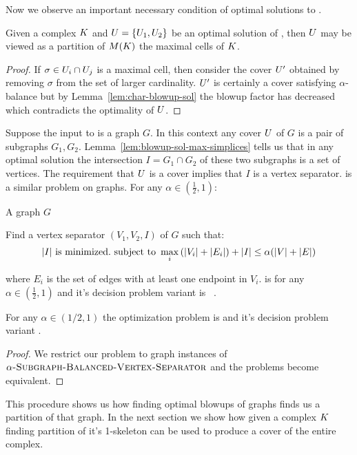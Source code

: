 \documentclass{jocg}
\begin{document}
\noindent Now we observe an important necessary condition of optimal solutions to \ablp{}.
\begin{lemma}
\label{lem:blowup-sol-max-simplices}
Given a complex $K$ and $U = \{U_1, U_2\}$ be an optimal solution of  \ablp{}, then 
$U$ may be viewed as a partition of $M(K)$ the maximal cells of $K$.
\end{lemma}
\begin{proof}
If $\sigma \in U_i \cap U_j$ is a maximal cell, then consider the cover
$U'$ obtained by removing $\sigma$ from the set of larger
cardinality. $U'$ is certainly a cover satisfying $\alpha$-balance but
by Lemma~\ref{lem:char-blowup-sol} the blowup factor has decreased
which contradicts the optimality of $U$.
\end{proof}
\noindent Suppose the input to \ablp{} is a graph $G$. In this context any cover $U$ of $G$ is a pair of subgraphs $G_1,G_2$.
Lemma~\ref{lem:blowup-sol-max-simplices} tells us that in any optimal solution the intersection $I = G_1 \cap G_2$ of these two 
subgraphs is a set of vertices. The requirement that $U$ is a cover implies that $I$ is a vertex separator.  \avertex{} is a similar problem on graphs. 
For any $\alpha \in (\frac{1}{2},1)$:
\begin{description}
\addtolength{\itemsep}{-.8\baselineskip}
\item[\textsc{Problem:}]  \avertex{}
\item[\textsc{Instance:}] A graph $G$
\item[\textsc{Goal:}] Find a vertex separator $(V_1,V_2,I)$ of $G$ such that: 
\[ |I| \textrm{ is minimized.} \textrm{ subject to } \max_i{(|V_i| + |E_i|)} + |I| \leq \alpha(|V|+|E|)  \]
\end{description}
where $E_i$ is the set of edges with at least one endpoint in $V_i$. \avertex{} is \NPH{} for any $\alpha \in (\frac{1}{2},1)$ and it's decision problem variant is \NPC{}~\cite{rhl-yaggpis-14}.
\begin{theorem}
For any $\alpha \in (1/2,1)$ the optimization problem \ablp{}  is \NPH{} and it's decision problem variant \NPC{}.
\end{theorem}
\begin{proof}
We restrict our problem to graph instances of $\textsc{$\alpha$-Subgraph-Balanced-Vertex-Separator}{}$ and the problems become equivalent.
\end{proof}
This procedure shows us how finding optimal blowups of graphs finds us a partition of that graph. In the next section we show how given a complex $K$ 
finding partition of it's 1-skeleton can be used to produce a cover of the entire complex.
\end{document}
